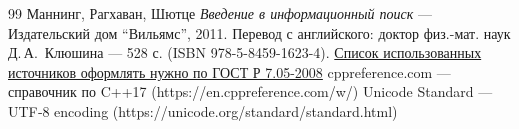 \begin{thebibliography}{99}
Маннинг, Рагхаван, Шютце
{\itshape Введение в информационный поиск} --- Издательский дом \enquote{Вильямс}, 2011. Перевод с английского: доктор физ.-мат. наук Д.\,А.\, Клюшина --- 528 с. (ISBN 978-5-8459-1623-4).
\href{http://www.ifap.ru/library/gost/7052008.pdf}{Список использованных источников оформлять нужно по ГОСТ Р 7.05-2008}
cppreference.com — справочник по C++17 (https://en.cppreference.com/w/)
Unicode Standard — UTF‑8 encoding (https://unicode.org/standard/standard.html)
\end{thebibliography}
\pagebreak
